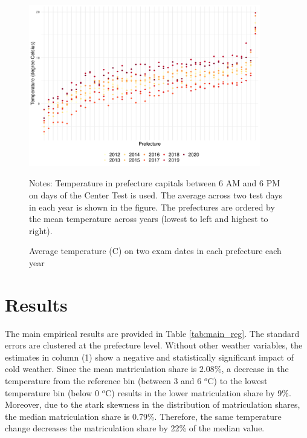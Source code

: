 \documentclass[12pt,letterpaper]{article}
\begin{document}
\begin{figure}[H]
  \centering
  \caption{Average temperature (\degree C) on two exam dates in each prefecture each year}
  \includegraphics[width = 0.9\textwidth]{../Output/images/temperature_diff.pdf}
  \label{fig:temperature_diff}
  \footnotesize
  \begin{tablenotes}
    \item Notes:
      Temperature in prefecture capitals between 6 AM and 6 PM on days of the Center Test is used.
      The average across two test days in each year is shown in the figure.
      The prefectures are ordered by the mean temperature across years (lowest to left and highest to right).
  \end{tablenotes}
\end{figure}

\section{Results}\label{sec:results}

The main empirical results are provided in Table \ref{tab:main_reg}.
The standard errors are clustered at the prefecture level.
Without other weather variables, the estimates in column (1) show a negative and statistically significant impact of cold weather.
Since the mean matriculation share is $2.08$\%, a decrease in the temperature from the reference bin (between 3 and 6 $^o$C) to the lowest temperature bin (below 0 $^o$C) results in the lower matriculation share by 9\%.
Moreover, due to the stark skewness in the distribution of matriculation shares, the median matriculation share is $0.79$\%.
Therefore, the same temperature change decreases the matriculation share by 22\% of the median value.
\end{document}
